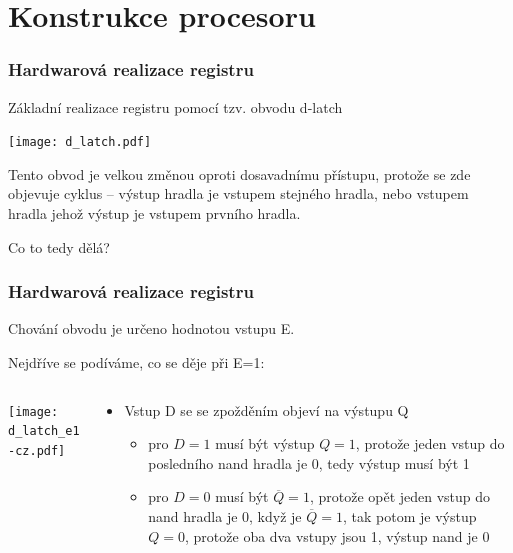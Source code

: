 \documentclass{beamer}
\begin{document}
\section{Konstrukce procesoru}

\begin{frame}
\frametitle{Hardwarová realizace registru}
Základní realizace registru pomocí tzv. obvodu d-latch
\begin{center}
\texttt{[image: d\_latch.pdf]}
\end{center}

Tento obvod je velkou změnou oproti dosavadnímu přístupu, protože se zde objevuje cyklus -- výstup hradla je vstupem stejného hradla, nebo vstupem hradla jehož výstup je vstupem prvního hradla.

Co to tedy dělá?

\end{frame}

\begin{frame}
\frametitle{Hardwarová realizace registru}

Chování obvodu je určeno hodnotou vstupu E.

Nejdříve se podíváme, co se děje při E=1:
\begin{columns}
\begin{column}{0.5\textwidth}
\begin{center}
\texttt{[image: d\_latch\_e1-cz.pdf]}
\end{center}
\end{column}
\begin{column}{0.5\textwidth}  
\begin{itemize}
\item Vstup D se se zpožděním objeví na výstupu Q
\begin{itemize}
\item pro $D=1$ musí být výstup $Q=1$, protože jeden vstup do posledního nand hradla je 0, tedy výstup musí být 1
\item pro $D=0$ musí být $\overline{Q}=1$, protože opět jeden vstup do nand hradla je 0, když je $\overline{Q}=1$, tak potom je výstup $Q=0$, protože oba dva vstupy jsou 1, výstup nand je 0
\end{itemize}
\end{itemize}
\end{column}
\end{columns}

\end{frame}
\end{document}
